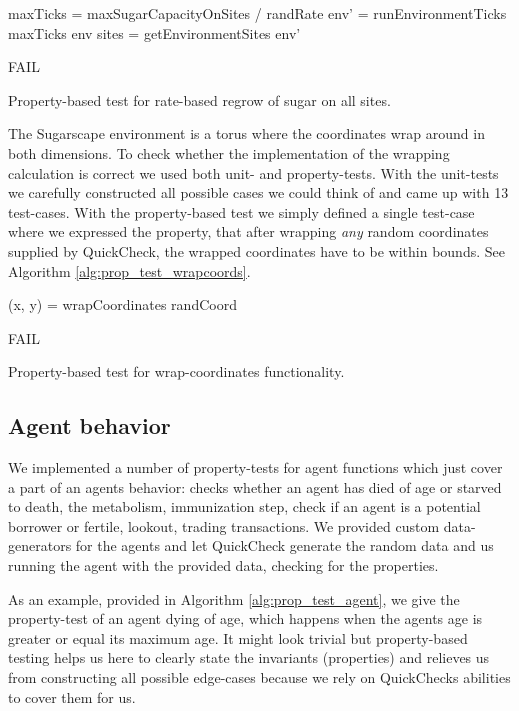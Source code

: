 \begin{algorithm}
maxTicks = maxSugarCapacityOnSites / randRate\;
env' = runEnvironmentTicks maxTicks env\;
sites = getEnvironmentSites env'\;

 {
  FAIL\;
}
\caption{Property-based test for rate-based regrow of sugar on all sites.}
\label{alg:prop_test_rateregwroth}
\end{algorithm}

The Sugarscape environment is a torus where the coordinates wrap around in both dimensions. To check whether the implementation of the wrapping calculation is correct we used both unit- and property-tests. With the unit-tests we carefully constructed all possible cases we could think of and came up with 13 test-cases. With the property-based test we simply defined a single test-case where we expressed the property, that after wrapping \textit{any} random coordinates supplied by QuickCheck, the wrapped coordinates have to be within bounds. See Algorithm \ref{alg:prop_test_wrapcoords}.

\begin{algorithm}
(x, y) = wrapCoordinates randCoord\;

 {
  FAIL\;
}
\caption{Property-based test for wrap-coordinates functionality.}
\label{alg:prop_test_wrapcoords}
\end{algorithm}

\subsection{Agent behavior}
We implemented a number of property-tests for agent functions which just cover a part of an agents behavior: checks whether an agent has died of age or starved to death, the metabolism, immunization step, check if an agent is a potential borrower or fertile, lookout, trading transactions. We provided custom data-generators for the agents and let QuickCheck generate the random data and us running the agent with the provided data, checking for the properties. 

As an example, provided in Algorithm \ref{alg:prop_test_agent}, we give the property-test of an agent dying of age, which happens when the agents age is greater or equal its maximum age. It might look trivial but property-based testing helps us here to clearly state the invariants (properties) and relieves us from constructing all possible edge-cases because we rely on QuickChecks abilities to cover them for us.

